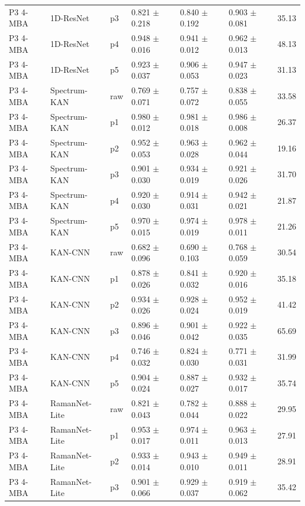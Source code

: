 {\begin{longtable}{L{2.35cm}L{2.4cm}L{1.0cm}L{2.35cm}L{2.25cm}L{2.25cm}L{1.45cm}}
P3 4-MBA & 1D-ResNet & p3 & 0.821 $\pm$ 0.218 & 0.840 $\pm$ 0.192 & 0.903 $\pm$ 0.081 & 35.13 \\
P3 4-MBA & 1D-ResNet & p4 & 0.948 $\pm$ 0.016 & 0.941 $\pm$ 0.012 & 0.962 $\pm$ 0.013 & 48.13 \\
P3 4-MBA & 1D-ResNet & p5 & 0.923 $\pm$ 0.037 & 0.906 $\pm$ 0.053 & 0.947 $\pm$ 0.023 & 31.13 \\
P3 4-MBA & Spectrum-KAN & raw & 0.769 $\pm$ 0.071 & 0.757 $\pm$ 0.072 & 0.838 $\pm$ 0.055 & 33.58 \\
P3 4-MBA & Spectrum-KAN & p1 & 0.980 $\pm$ 0.012 & 0.981 $\pm$ 0.018 & 0.986 $\pm$ 0.008 & 26.37 \\
P3 4-MBA & Spectrum-KAN & p2 & 0.952 $\pm$ 0.053 & 0.963 $\pm$ 0.028 & 0.962 $\pm$ 0.044 & 19.16 \\
P3 4-MBA & Spectrum-KAN & p3 & 0.901 $\pm$ 0.030 & 0.934 $\pm$ 0.019 & 0.921 $\pm$ 0.026 & 31.70 \\
P3 4-MBA & Spectrum-KAN & p4 & 0.920 $\pm$ 0.030 & 0.914 $\pm$ 0.031 & 0.942 $\pm$ 0.021 & 21.87 \\
P3 4-MBA & Spectrum-KAN & p5 & 0.970 $\pm$ 0.015 & 0.974 $\pm$ 0.019 & 0.978 $\pm$ 0.011 & 21.26 \\
P3 4-MBA & KAN-CNN & raw & 0.682 $\pm$ 0.096 & 0.690 $\pm$ 0.103 & 0.768 $\pm$ 0.059 & 30.54 \\
P3 4-MBA & KAN-CNN & p1 & 0.878 $\pm$ 0.026 & 0.841 $\pm$ 0.032 & 0.920 $\pm$ 0.016 & 35.18 \\
P3 4-MBA & KAN-CNN & p2 & 0.934 $\pm$ 0.026 & 0.928 $\pm$ 0.024 & 0.952 $\pm$ 0.019 & 41.42 \\
P3 4-MBA & KAN-CNN & p3 & 0.896 $\pm$ 0.046 & 0.901 $\pm$ 0.042 & 0.922 $\pm$ 0.035 & 65.69 \\
P3 4-MBA & KAN-CNN & p4 & 0.746 $\pm$ 0.032 & 0.824 $\pm$ 0.030 & 0.771 $\pm$ 0.031 & 31.99 \\
P3 4-MBA & KAN-CNN & p5 & 0.904 $\pm$ 0.024 & 0.887 $\pm$ 0.027 & 0.932 $\pm$ 0.017 & 35.74 \\
P3 4-MBA & RamanNet-Lite & raw & 0.821 $\pm$ 0.043 & 0.782 $\pm$ 0.044 & 0.888 $\pm$ 0.022 & 29.95 \\
P3 4-MBA & RamanNet-Lite & p1 & 0.953 $\pm$ 0.017 & 0.974 $\pm$ 0.011 & 0.963 $\pm$ 0.013 & 27.91 \\
P3 4-MBA & RamanNet-Lite & p2 & 0.933 $\pm$ 0.014 & 0.943 $\pm$ 0.010 & 0.949 $\pm$ 0.011 & 28.91 \\
P3 4-MBA & RamanNet-Lite & p3 & 0.901 $\pm$ 0.066 & 0.929 $\pm$ 0.037 & 0.919 $\pm$ 0.062 & 35.42 \\

\end{longtable}}
